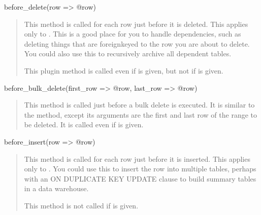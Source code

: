 \documentclass[letterpaper,10pt,english]{sphinxmanual}
\begin{document}
before\_delete(row =\textgreater{} @row)
\begin{quote}

This method is called for each row just before it is deleted.  This applies only
to {\hyperref[\detokenize{mariadb-archiver:cmdoption-mariadb-archiver-source}]{}}.  This is a good place for you to handle dependencies, such as
deleting things that are foreign\sphinxhyphen{}keyed to the row you are about to delete.  You
could also use this to recursively archive all dependent tables.

This plugin method is called even if {\hyperref[\detokenize{mariadb-archiver:cmdoption-mariadb-archiver-no-delete}]{}} is given, but not if
{\hyperref[\detokenize{mariadb-archiver:cmdoption-mariadb-archiver-bulk-delete}]{}} is given.
\end{quote}

before\_bulk\_delete(first\_row =\textgreater{} @row, last\_row =\textgreater{} @row)
\begin{quote}

This method is called just before a bulk delete is executed.  It is similar to
the  method, except its arguments are the first and last row of
the range to be deleted.  It is called even if {\hyperref[\detokenize{mariadb-archiver:cmdoption-mariadb-archiver-no-delete}]{}} is given.
\end{quote}

before\_insert(row =\textgreater{} @row)
\begin{quote}

This method is called for each row just before it is inserted.  This applies
only to {\hyperref[\detokenize{mariadb-archiver:cmdoption-mariadb-archiver-dest}]{}}.  You could use this to insert the row into multiple tables,
perhaps with an ON DUPLICATE KEY UPDATE clause to build summary tables in a data
warehouse.

This method is not called if {\hyperref[\detokenize{mariadb-archiver:cmdoption-mariadb-archiver-bulk-insert}]{}} is given.
\end{quote}
\end{document}
